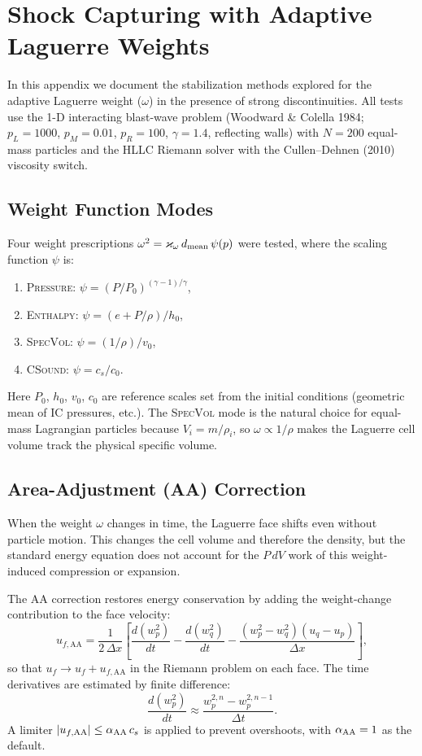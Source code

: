 \documentclass[twocolumn]{aastex63}
\begin{document}
\section{Shock Capturing with Adaptive Laguerre Weights} \label{app:shockcap}

In this appendix we document the stabilization methods
explored for the adaptive Laguerre weight ($\omega$) in the
presence of strong discontinuities.
All tests use the 1-D interacting blast-wave problem
(Woodward \& Colella 1984; $p_L=1000$, $p_M=0.01$,
$p_R=100$, $\gamma=1.4$, reflecting walls) with $N=200$
equal-mass particles and the HLLC Riemann solver with
the Cullen--Dehnen (2010) viscosity switch.

\subsection{Weight Function Modes}

Four weight prescriptions $\omega^2 = \varkappa_\omega \,d_{\rm mean}\,\psi(p)$
were tested, where the scaling function $\psi$ is:
\begin{enumerate}[label=(\roman*)]
  \item \textsc{Pressure}: $\psi = (P/P_0)^{(\gamma-1)/\gamma}$,
  \item \textsc{Enthalpy}: $\psi = (e + P/\rho)/h_0$,
  \item \textsc{SpecVol}: $\psi = (1/\rho)/v_0$,
  \item \textsc{CSound}: $\psi = c_s / c_0$.
\end{enumerate}
Here $P_0$, $h_0$, $v_0$, $c_0$ are reference scales set from the
initial conditions (geometric mean of IC pressures, etc.).
The \textsc{SpecVol} mode is the natural choice for equal-mass
Lagrangian particles because $V_i = m/\rho_i$, so
$\omega \propto 1/\rho$ makes the Laguerre cell volume track the
physical specific volume.

\subsection{Area-Adjustment (AA) Correction}

When the weight $\omega$ changes in time, the Laguerre face
shifts even without particle motion.  This changes the cell
volume and therefore the density, but the standard energy
equation does not account for the $P\,dV$ work of this
weight-induced compression or expansion.

The AA correction restores energy conservation by adding the
weight-change contribution to the face velocity:
\begin{equation}
  u_{f,\mathrm{AA}} = \frac{1}{2\,\Delta x}\left[
    \frac{d(w_p^2)}{dt} - \frac{d(w_q^2)}{dt}
    - \frac{(w_p^2-w_q^2)(u_q-u_p)}{\Delta x}\right],
\end{equation}
so that $u_f \to u_f + u_{f,\mathrm{AA}}$ in the Riemann problem
on each face.  The time derivatives are estimated by
finite difference:
\begin{equation}
  \frac{d(w_p^2)}{dt} \approx \frac{w_p^{2,n} - w_p^{2,n-1}}{\Delta t}.
\end{equation}
A limiter $|u_{f,\mathrm{AA}}| \le \alpha_{\rm AA}\, c_s$ is
applied to prevent overshoots, with $\alpha_{\rm AA}=1$ as the
default.
\end{document}
